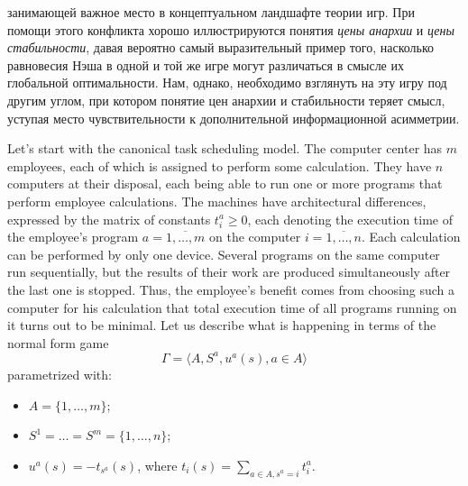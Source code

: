 занимающей важное место в концептуальном ландшафте теории игр. При помощи этого конфликта хорошо иллюстрируются понятия \emph{цены анархии} и \emph{цены стабильности}, давая вероятно самый выразительный пример того, насколько равновесия Нэша в одной и той же игре могут различаться в смысле их глобальной оптимальности. Нам, однако, необходимо взглянуть на эту игру под другим углом, при котором понятие цен анархии и стабильности теряет смысл, уступая место чувствительности к дополнительной информационной асимметрии.

Let's start with the canonical task scheduling model. The computer center has $m$ employees, each of which is assigned to perform some calculation. They have $n$ computers at their disposal, each being able to run one or more programs that perform employee calculations. The machines have architectural differences, expressed by the matrix of constants $t_i^a \ge 0$, each denoting the execution time of the employee's program $a=\overline{1,\ldots,m}$ on the computer $i=\overline{1,\ldots, n}$. Each calculation can be performed by only one device. Several programs on the same computer run sequentially, but the results of their work are produced simultaneously after the last one is stopped. Thus, the employee's benefit comes from choosing such a computer for his calculation that total execution time of all programs running on it turns out to be minimal. Let us describe what is happening in terms of the normal form game %
\begin{equation}\label{intro:game}
	\Gamma = \langle A, S^a, u^a(s), a \in A \rangle
\end{equation}
parametrized with:
\begin{itemize}
	\item $A = \{ 1, \ldots, m \}$;
	\item $S^1 = \ldots = S^m = \{ 1, \ldots, n \}$;
	\item $u^a(s) = -t_{s^a}(s)$, where $t_i(s) = \sum\limits_{a \in A, s^a = i} t_i^a$.
\end{itemize}

